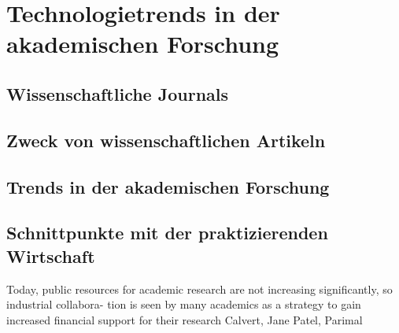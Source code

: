 \section{Technologietrends in der akademischen Forschung}
\subsection{Wissenschaftliche Journals}
\subsection{Zweck von wissenschaftlichen Artikeln}
\subsection{Trends in der akademischen Forschung}
\subsection{Schnittpunkte mit der praktizierenden Wirtschaft}
Today, public resources for academic research are
not increasing significantly, so industrial collabora- tion is seen by many academics as a strategy to gain increased financial support for their research
Calvert, Jane
Patel, Parimal